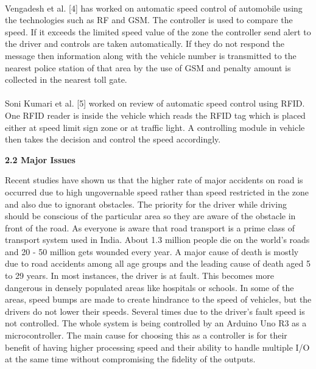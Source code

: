 \documentclass[a4paper,12pt, English]{article}
\begin{document}
\begin{normalsize}
\\
Vengadesh et al. [4] has worked on automatic speed control of automobile using the technologies such as RF and GSM. The controller is used to compare the speed. If it exceeds the limited speed value of the zone the controller send alert to the driver and controls are taken automatically. If they do not respond the message then information along with the vehicle number is transmitted to the nearest police station of that area by the use of GSM and penalty amount is collected in the nearest toll gate.\\
\\
 Soni Kumari et al. [5] worked on review of automatic speed control using RFID. One RFID reader is inside the vehicle which reads the RFID tag which is placed either at speed limit sign zone or at traffic light. A controlling module in vehicle then takes the decision and control the speed accordingly.\\
\newline
\begin{large}
\textbf{2.2 Major Issues}
\end{large}
\newline
Recent studies have shown us that the higher rate of
major accidents on road is occurred due to high
ungovernable speed rather than speed restricted in the zone
and also due to ignorant obstacles. The priority for the driver
while driving should be conscious of the particular area so
they are aware of the obstacle in front of the road. As
everyone is aware that road transport is a prime class of
transport system used in India. About 1.3 million people die
on the world's roads and 20 - 50 million gets wounded every
year. A major cause of death is mostly due to road accidents
among all age groups and the leading cause of death aged 5
to 29 years. In most instances, the driver is at fault. This
becomes more dangerous in densely populated areas like
hospitals or schools. In some of the areas, speed bumps are
made to create hindrance to the speed of vehicles, but the
drivers do not lower their speeds. Several times due to the
driver’s fault speed is not controlled. The whole system is
being controlled by an Arduino Uno R3 as a
microcontroller. The main cause for choosing this as a
controller is for their benefit of having higher processing
speed and their ability to handle multiple I/O at the same
time without compromising the fidelity of the outputs.\\

\\
\\
\newpage
\begin{center}

\end{center}
\end{normalsize}
\end{document}
